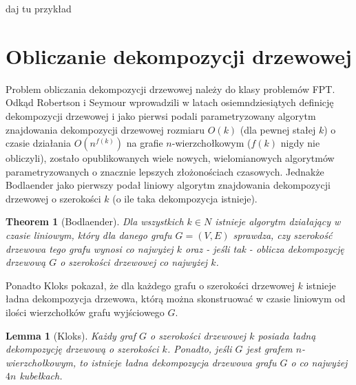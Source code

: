 \documentclass[12pt, oneside]{report}
\newtheorem{theorem}{Theorem}
\newtheorem{lemma}{Lemma}
\newcommand\Omicron{O}
\begin{document}
daj tu przykład
		\section{Obliczanie dekompozycji drzewowej}

Problem obliczania dekompozycji drzewowej należy do klasy problemów FPT. Odkąd Robertson i Seymour \cite{robertson&seymour} wprowadzili w latach osiemndziesiątych definicję dekompozycji drzewowej i jako pierwsi podali parametryzowany algorytm znajdowania dekompozycji drzewowej rozmiaru $\Omicron(k)$ (dla pewnej stałej $k$) o czasie działania $\Omicron(n^{f(k)})$ na grafie $n$-wierzchołkowym ($f(k)$ nigdy nie obliczyli), zostało opublikowanych wiele nowych, wielomianowych algorytmów parametryzowanych o znacznie lepszych złożonościach czasowych. Jednakże Bodlaender \cite{bodlaender} jako pierwszy podał liniowy algorytm znajdowania dekompozycji drzewowej o szerokości $k$ (o ile taka dekompozycja istnieje). 

\begin{theorem}[Bodlaender]
Dla wszystkich $k \in N$ istnieje algorytm działający w czasie liniowym, który dla danego grafu $G = (V, E)$ sprawdza, czy szerokość drzewowa tego grafu wynosi co najwyżej $k$ oraz - jeśli tak - oblicza dekompozycję drzewową $G$ o szerokości drzewowej co najwyżej $k$.  
\end{theorem}

Ponadto Kloks \cite{kloks} pokazał, że dla każdego grafu o szerokości drzewowej $k$ istnieje ładna dekompozycja drzewowa, którą można skonstruować w czasie liniowym od ilości wierzchołków grafu wyjściowego $G$.

\begin{lemma}[Kloks]
\label{kloks}
Każdy graf $G$ o szerokości drzewowej $k$ posiada ładną dekompozycję drzewową o szerokości $k$. Ponadto, jeśli $G$ jest grafem $n$-wierzchołkowym, to istnieje ładna dekompozycja drzewowa grafu $G$ o co najwyżej $4n$ kubełkach.
\end{lemma}
\end{document}
